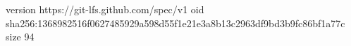 version https://git-lfs.github.com/spec/v1
oid sha256:1368982516f0627485929a598d55f1e21e3a8b13c2963df9bd3b9fc86bf1a77c
size 94
